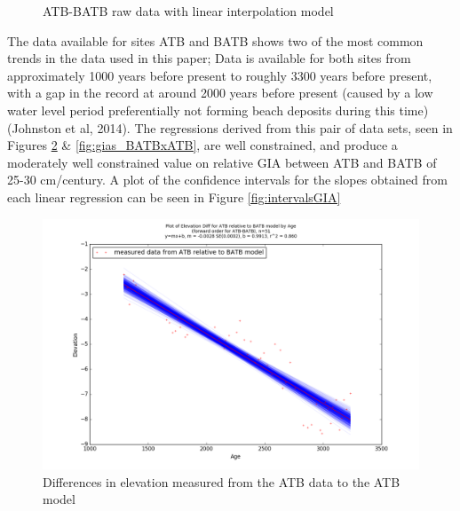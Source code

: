 

\newpage
\begin{figure}[h]
	\caption{ATB-BATB raw data with linear interpolation model}
	\label{fig:data_ATBxBATB}
\end{figure}
The data available for sites ATB and BATB shows two of the most common trends in
 the data used in this paper; Data is available for both sites from
 approximately 1000 years before present to roughly 3300 years before present,
 with a gap in the record at around 2000 years before present (caused by a low
 water level period preferentially not forming beach deposits during this time)
 (Johnston et al, 2014). The regressions derived from this pair of data sets,
 seen in Figures \ref{fig:gias_ATBxBATB} \& \ref{fig:gias_BATBxATB}, are well
 constrained, and produce a moderately well constrained value on relative GIA
 between ATB and BATB of 25-30 cm/century. A plot of the confidence intervals
 for the slopes obtained from each linear regression can be seen in Figure \ref{fig:intervalsGIA}


\newpage

\begin{figure}[h]
	\includegraphics[width=0.9\linewidth]{data/bothNonZero/withinSeventyFivePercent/gias/theGIA_ATB_relative_to_BATB.png}
	\caption{Differences in elevation measured from the ATB data to the ATB model}
	\label{fig:gias_ATBxBATB}
\end{figure}
\newpage



